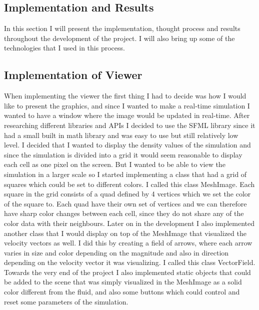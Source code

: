\documentclass{article}
\begin{document}
\begin{multicols}{2}
\section{Implementation and Results}
In this section I will present the implementation, thought process and results throughout the development of the project. I will also bring up some of the technologies that I used in this process.

\subsection{Implementation of Viewer}
When implementing the viewer the first thing I had to decide was how I would like to present the graphics, and since I wanted to make a real-time simulation I wanted to have a window where the image would be updated in real-time. After researching different libraries and APIs I decided to use the SFML library since it had a small built in math library and was easy to use but still relatively low level.
I decided that I wanted to display the density values of the simulation and since the simulation is divided into a grid it would seem reasonable to display each cell as one pixel on the screen. But I wanted to be able to view the simulation in a larger scale so I started implementing a class that had a grid of squares which could be set to different colors. I called this class MeshImage. Each square in the grid consists of a quad defined by 4 vertices which we set the color of the square to. Each quad have their own set of vertices and we can therefore have sharp color changes between each cell, since they do not share any of the color data with their neighbours.
Later on in the development I also implemented another class that I would display on top of the MeshImage that visualized the velocity vectors as well. I did this by creating a field of arrows, where each arrow varies in size and color depending on the magnitude and also in direction depending on the velocity vector it was visualizing. I called this class VectorField.
Towards the very end of the project I also implemented static objects that could be added to the scene that was simply visualized in the MeshImage as a solid color different from the fluid, and also some buttons which could control and reset some parameters of the simulation.


\end{multicols}
\end{document}
